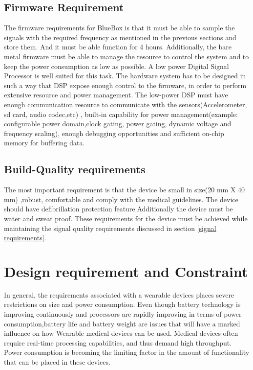 \subsection{Firmware Requirement }
\hspace{10mm}The firmware requirements for BlueBox  is that it must be able to sample the signals with the required frequency as mentioned in the previous sections and store them. And it must be able function for 4 hours. Additionally, the bare metal firmware must be able to manage the resource to control the system and to keep the power consumption as low as possible. A low power Digital Signal Processor is well suited for this task. The hardware system has to be designed in such a way that DSP  expose enough control to the firmware, in order to perform extensive resource and power management. The low-power DSP must have enough communication resource to communicate with the sensors(Accelerometer, sd card, audio codec,etc) , built-in capability for power management(example: configurable power domain,clock gating, power gating, dynamic voltage and frequency scaling), enough debugging opportunities and sufficient on-chip memory for buffering data. 

\subsection {Build-Quality requirements} 
\hspace{10mm}The most important requirement is that the device be small in size(20 mm X 40 mm) ,robust, comfortable and comply with the medical guidelines. The device should have defibrillation protection feature.Additionally the device must be water and sweat proof. These requirements for the device must be achieved while maintaining the signal quality requirements discussed in section \ref{signal requirements}.  

\section {Design requirement and Constraint} 
In general, the requirements associated with a wearable devices places severe restrictions on size and power consumption. Even though battery technology is improving continuously and processors are rapidly improving in terms of power consumption,battery life and battery weight are issues that will have a marked influence on how  Wearable medical devices can be used. Medical devices often require real-time processing capabilities, and thus demand high throughput. Power consumption is becoming the limiting factor in the amount of functionality that can be placed in these devices. 

